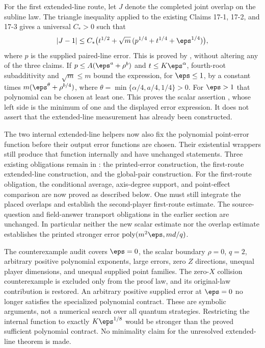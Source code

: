 \documentclass[11pt]{article}
\DeclareMathOperator{\poly}{poly}
\begin{document}
For the first extended-line route, let $J$ denote the completed joint
overlap on the subline law. The triangle inequality applied to the existing
Claims 17-1, 17-2, and 17-3 gives a universal $C_*>0$ such that
\[
 |J-1|\le C_*\bigl(t^{1/2}+\sqrt m\,(p^{1/4}+t^{1/4}+\eps^{1/4})\bigr),
\]
where $p$ is the supplied paired-line error. This is proved by
, without
altering any of the three claims. If $p\le A(\eps^a+\rho^b)$ and
$t\le K\eps^\alpha$, fourth-root subadditivity and $\sqrt m\le m$
bound the expression, for $\eps\le1$, by a constant times
$m(\eps^\theta+\rho^{b/4})$, where
$\theta=\min\{\alpha/4,a/4,1/4\}>0$. For $\eps>1$ that polynomial
can be chosen at least one. This proves the scalar assertion
, whose left
side is the minimum of one and the displayed error expression. It does
not assert that the extended-line measurement has already been constructed.

The two internal extended-line helpers now also fix the polynomial
point-error function before their output error functions are chosen.
Their existential wrappers still produce that function internally and
have unchanged statements. Three existing obligations remain in
: the printed-error construction, the
first-route extended-line construction, and the global-pair construction.
For the first-route obligation, the conditional average, axis-degree support,
and point-effect comparison are now proved as described below. One must still
integrate the placed overlaps and establish the second-player first-route
estimate. The source-question and field-answer transport obligations in
the earlier section are unchanged. In particular neither the new scalar
estimate nor the overlap estimate establishes the printed stronger error
$\poly(m^2\eps,md/q)$.

The counterexample audit covers $\eps=0$, the scalar boundary $\rho=0$,
$q=2$, arbitrary positive polynomial exponents, large errors, zero $Z$
directions, unequal player dimensions, and unequal supplied point families.
The zero-$X$ collision counterexample is excluded only from the proof law,
and its original-law contribution is restored. An arbitrary positive
supplied error at $\eps=0$ no longer satisfies the specialized polynomial
contract. These are symbolic arguments, not a numerical search over all
quantum strategies. Restricting the internal function to exactly
$K\eps^{1/8}$ would be stronger than the proved sufficient polynomial
contract. No minimality claim for the unresolved extended-line theorem is
made.
\end{document}
